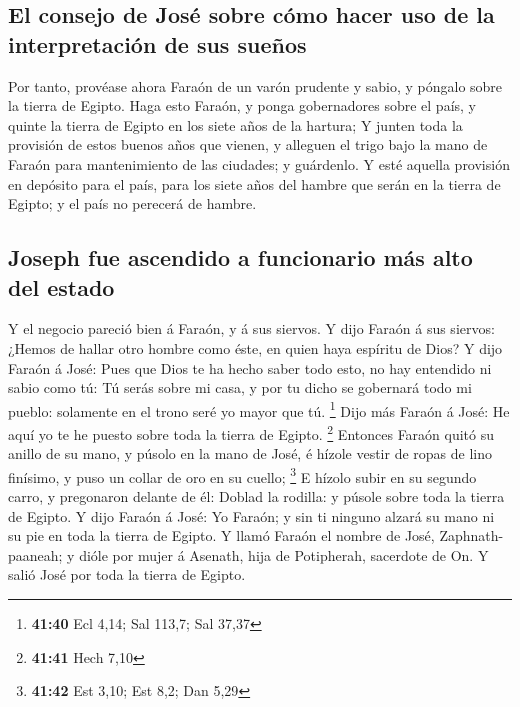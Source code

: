 \hypertarget{el-consejo-de-josuxe9-sobre-cuxf3mo-hacer-uso-de-la-interpretaciuxf3n-de-sus-sueuxf1os}{%
\subsection{El consejo de José sobre cómo hacer uso de la interpretación
de sus
sueños}\label{el-consejo-de-josuxe9-sobre-cuxf3mo-hacer-uso-de-la-interpretaciuxf3n-de-sus-sueuxf1os}}

 Por tanto, provéase ahora Faraón de un varón prudente y
sabio, y póngalo sobre la tierra de Egipto.  Haga esto
Faraón, y ponga gobernadores sobre el país, y quinte la tierra de Egipto
en los siete años de la hartura;  Y junten toda la
provisión de estos buenos años que vienen, y alleguen el trigo bajo la
mano de Faraón para mantenimiento de las ciudades; y guárdenlo.
 Y esté aquella provisión en depósito para el país, para
los siete años del hambre que serán en la tierra de Egipto; y el país no
perecerá de hambre.

\hypertarget{joseph-fue-ascendido-a-funcionario-muxe1s-alto-del-estado}{%
\subsection{Joseph fue ascendido a funcionario más alto del
estado}\label{joseph-fue-ascendido-a-funcionario-muxe1s-alto-del-estado}}

 Y el negocio pareció bien á Faraón, y á sus siervos.
 Y dijo Faraón á sus siervos: ¿Hemos de hallar otro hombre
como éste, en quien haya espíritu de Dios?  Y dijo Faraón á
José: Pues que Dios te ha hecho saber todo esto, no hay entendido ni
sabio como tú:  Tú serás sobre mi casa, y por tu dicho se
gobernará todo mi pueblo: solamente en el trono seré yo mayor que tú.
\footnote{\textbf{41:40} Ecl 4,14; Sal 113,7; Sal 37,37} 
Dijo más Faraón á José: He aquí yo te he puesto sobre toda la tierra de
Egipto. \footnote{\textbf{41:41} Hech 7,10}  Entonces
Faraón quitó su anillo de su mano, y púsolo en la mano de José, é hízole
vestir de ropas de lino finísimo, y puso un collar de oro en su cuello;
\footnote{\textbf{41:42} Est 3,10; Est 8,2; Dan 5,29}  E
hízolo subir en su segundo carro, y pregonaron delante de él: Doblad la
rodilla: y púsole sobre toda la tierra de Egipto.  Y dijo
Faraón á José: Yo Faraón; y sin ti ninguno alzará su mano ni su pie en
toda la tierra de Egipto.  Y llamó Faraón el nombre de
José, Zaphnath-paaneah; y dióle por mujer á Asenath, hija de Potipherah,
sacerdote de On. Y salió José por toda la tierra de Egipto.

